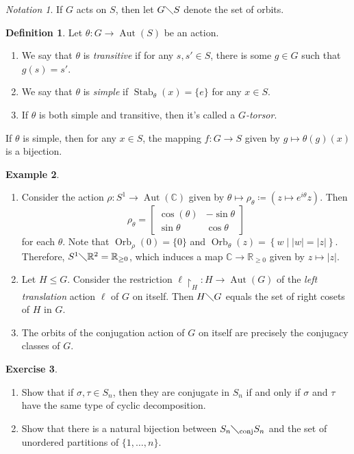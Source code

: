 \documentclass[10pt,letterpaper,cm]{nupset}
\theoremstyle{definition}
\newtheorem{definition}{Definition}[subsection]
\newtheorem{exmp}[definition]{Example}
\theoremstyle{theorem}
\newtheorem{exercise}[definition]{Exercise}
\theoremstyle{remark}
\newtheorem*{notation}{Notation}
\newcommand{\C}{\mathbb C}
\newcommand{\R}{\mathbb R}
\newcommand{\1}{\mathbf{1}}
\newcommand{\0}{\vec 0}
\DeclareMathOperator{\aut}{Aut}
\DeclareMathOperator{\stab}{Stab}
\DeclareMathOperator{\orb}{Orb}
\DeclareMathOperator{\conj}{conj}
\begin{document}
\begin{notation}
If $G$ acts on $S$, then let $G \diagdown S$ denote the set of orbits.
\end{notation}

\begin{definition} Let $\theta: G \to \aut(S)$ be an action.
\begin{enumerate}
\item We say that  $\theta$ is \textit{transitive} if for any $s, s' \in S$, there is some $g \in G$ such that $g(s) = s'$. 
\item We say that $\theta$ is \textit{simple} if $\stab_\theta(x) = \{e\}$ for any $x \in S$.
\item If $\theta$ is both simple and transitive, then it's called a \textit{$G$-torsor}.
\end{enumerate}
\end{definition}

If $\theta$ is simple, then for any $x \in S$, the mapping $f: G \to S$ given by $g\mapsto \theta(g)(x)$ is a bijection.

\begin{exmp} $ $
\begin{enumerate}
\item Consider the action $\rho: S^1 \to \aut(\C)$ given by $\theta \mapsto \rho_{\theta}\coloneqq \left(z \mapsto e^{i\theta}z\right).$ Then $$\rho_{\theta} = \begin{bmatrix} \cos(\theta) & {-\sin{\theta}} \\ \sin{\theta} & \cos{\theta} \end{bmatrix}$$ for each $\theta$.  Note that $\orb_{\rho}(0) = \{0\}$ and $\orb_{\theta}(z) = \left\{w \mid \lvert{w}\rvert = \lvert{z}\rvert\right\}$. Therefore,  $S^1 \diagdown \R^2 = \R_{\geq 0}$, which induces a map $\C \to \R_{\geq 0}$ given by $z \mapsto \lvert{z}\rvert$.
\item Let $H \leq G$. Consider the restriction $\ell\restriction_H : H \to \aut(G)$ of the \textit{left translation} action $\ell$ of $G$ on itself. Then $H \diagdown G$ equals the set of right cosets of $H$ in $G$. 
\item The orbits of the conjugation action of $G$ on itself are precisely  the conjugacy classes of $G$. 
\end{enumerate}
\end{exmp}

\begin{exercise} $ $
\begin{enumerate}

\item Show that if $\sigma, \tau \in S_n$, then they are conjugate in $S_n$  if and only if $\sigma$ and $\tau$ have the same type of cyclic decomposition.
\item Show that there is a natural bijection between ${S_n}\diagdown_{\conj}{S_n}$ and the set of unordered partitions of $\{1, \ldots, n\}$.
\end{enumerate}
\end{exercise}
\end{document}
